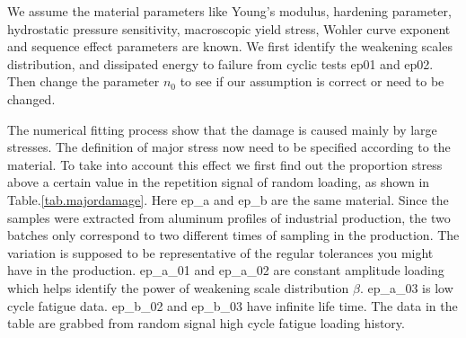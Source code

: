 \documentclass[3p,times,number,review]{elsarticle}
\begin{document}
We assume the material parameters like Young's modulus, hardening parameter, hydrostatic pressure sensitivity, macroscopic yield stress, Wohler curve exponent and sequence effect parameters are known. We first identify the weakening scales distribution, and dissipated energy to failure from cyclic tests ep01 and ep02. Then change the parameter $n_0$ to see if our assumption is correct or need to be changed. 



The numerical fitting process show that the damage is caused mainly by large stresses. The definition of major stress now need to be specified according to the material. To take into account this effect we first find out the proportion stress above a certain value in the repetition signal of random loading, as shown in Table.\ref{tab.majordamage}.  Here ep\_a and ep\_b are the same material. Since the samples were extracted from aluminum profiles of industrial production,  the two batches only  correspond to two different times of sampling in the production. The variation is supposed to be representative of the regular tolerances you might have in the production. ep\_a\_01 and ep\_a\_02 are constant amplitude loading which helps identify the power of weakening scale distribution $\beta$. ep\_a\_03 is low cycle fatigue data.  ep\_b\_02 and ep\_b\_03 have infinite life time. The data in the table are grabbed from random signal high cycle fatigue loading history.
\end{document}
